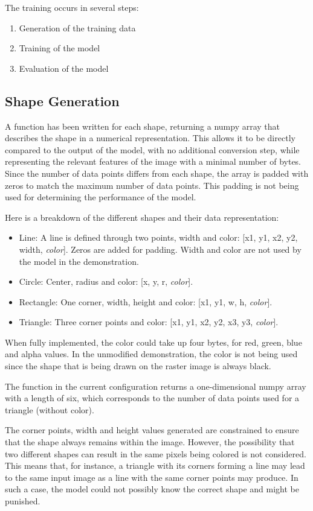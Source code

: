 \documentclass[12pt, a4paper, titlepage]{report}
\begin{document}
The training occurs in several steps:
\begin{enumerate}[label=\Roman*.]
   \item Generation of the training data
   \item Training of the model
   \item Evaluation of the model
\end{enumerate}


\subsection{Shape Generation}

A function has been written for each shape, returning a numpy array that describes the shape in a numerical representation. This allows it to be directly compared to the output of the model, with no additional conversion step, while representing the relevant features of the image with a minimal number of bytes. Since the number of data points differs from each shape, the array is padded with zeros to match the maximum number of data points. This padding is not being used for determining the performance of the model.

Here is a breakdown of the different shapes and their data representation:
\begin{itemize}
   \item Line: A line is defined through two points, width and color: [x1, y1, x2, y2, width, \emph{color}]. Zeros are added for padding. Width and color are not used by the model in the demonstration.
   \item Circle: Center, radius and color: [x, y, r, \emph{color}].
   \item Rectangle: One corner, width, height and color: [x1, y1, w, h, \emph{color}].
   \item Triangle: Three corner points and color: [x1, y1, x2, y2, x3, y3, \emph{color}].
\end{itemize}

When fully implemented, the color could take up four bytes, for red, green, blue and alpha values. In the unmodified demonstration, the color is not being used since the shape that is being drawn on the raster image is always black.

The function in the current configuration returns a one-dimensional numpy array with a length of six, which corresponds to the number of data points used for a triangle (without color).


The corner points, width and height values generated are constrained to ensure that the shape always remains within the image. However, the possibility that two different shapes can result in the same pixels being colored is not considered. This means that, for instance, a triangle with its corners forming a line may lead to the same input image as a line with the same corner points may produce. In such a case, the model could not possibly know the correct shape and might be punished.
\end{document}
